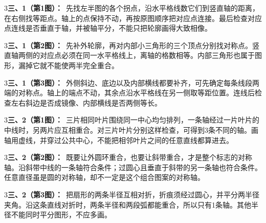 \documentclass[multi=snippet,border={5bp 20bp 5bp 5bp}]{standalone}
\newenvironment{snippet}[3]{\begin{minipage}{#1bp}\color{answerred}\fontsize{#2}{#3}\selectfont\raggedright}{\end{minipage}}
\begin{document}
\begin{snippet}{505}{11.5}{14}\begin{multicols}{3}\raggedcolumns \textbf{三、1（第1图）：}\ 先找左半图的各个拐点，沿水平格线数它们到竖直轴的距离，在右侧找等距点。轴上的点保持不动，再按原图顺序把对应点连接。最后检查对应点连线是否垂直于轴，并被轴平分，不能只把轮廓画得大致相像。\end{multicols}\end{snippet}
\begin{snippet}{505}{11.5}{14}\begin{multicols}{3}\raggedcolumns \textbf{三、1（第2图）：}\ 先补外轮廓，再对内部小三角形的三个顶点分别找对称点。竖直轴两侧的对应点必须在同一水平格线上，离轴的格数相等。内部三角形也属于图形，漏掉它就不能使两半完全重合。\end{multicols}\end{snippet}
\begin{snippet}{505}{11.5}{14}\begin{multicols}{3}\raggedcolumns \textbf{三、1（第3图）：}\ 外侧斜边、底边以及内部横线都要补齐，可先确定每条线段两端的对称点。轴上的端点不动，其余点沿水平格线在另一侧取等距位置。连线后检查左右斜边是否成镜像、内部横线是否两侧等长。\end{multicols}\end{snippet}
\begin{snippet}{505}{11.5}{14}\begin{multicols}{3}\raggedcolumns \textbf{三、2（第1图）：}\ 三片相同叶片围绕同一中心均匀排列，一条轴经过一片叶片的中线时，另两片应互相重合。对三片叶片分别这样检查，可得到3条不同的轴。画轴用虚线，并穿过公共中心，不能把相邻叶片之间的任意直线都算进去。\end{multicols}\end{snippet}
\begin{snippet}{505}{11.5}{14}\begin{multicols}{3}\raggedcolumns \textbf{三、2（第2图）：}\ 既要让外圆环重合，也要让斜带重合，才是整个标志的对称轴。沿斜带中线的一条轴符合条件；过圆心且垂直于斜带的另一条轴也符合条件。任意直径虽是圆的对称轴，却不一定是这个组合图案的对称轴。\end{multicols}\end{snippet}
\begin{snippet}{505}{11.5}{14}\begin{multicols}{3}\raggedcolumns \textbf{三、2（第3图）：}\ 把扇形的两条半径互相对折，折痕须经过圆心，并平分两半径夹角。沿这条直线对折时，两条半径和两段弧都能重合，所以只有1条轴。其他半径不能同时平分图形，不应多画。\end{multicols}\end{snippet}
\end{document}

